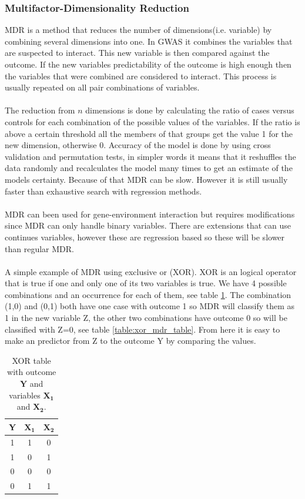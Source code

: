 \documentclass[10pt,a4paper]{report}
\begin{document}
\subsubsection{Multifactor-Dimensionality Reduction}
MDR is a method that reduces the number of dimensions(i.e. variable) by combining several dimensions into one. In GWAS it combines the variables that are suspected to interact. This new variable is then compared against the outcome. If the new variables predictability of the outcome is high enough then the variables that were combined are considered to interact. This process is usually repeated on all pair combinations of variables.\\
\\
The reduction from $n$ dimensions is done by calculating the ratio of cases versus controls for each combination of the possible values of the variables. If the ratio is above a certain threshold all the members of that groups get the value 1 for the new dimension, otherwise 0. Accuracy of the model is done by using cross validation and permutation tests, in simpler words it means that it reshuffles the data randomly and recalculates the model many times to get an estimate of the models certainty. Because of that MDR can be slow. However it is still usually faster than exhaustive search with regression methods.\cite{cordell_detect_review,mdr_2001}\\
\\
MDR can been used for gene-environment interaction but requires modifications since MDR can only handle binary variables. There are extensions that can use continues variables, however these are regression based so these will be slower than regular MDR.\cite{gene_enviroment_2013}\\
\\
A simple example of MDR using exclusive or (XOR). XOR is an logical operator that is true if one and only one of its two variables is true. We have 4 possible combinations and an occurrence for each of them, see table \ref{table:xor_table}. The combination (1,0) and (0,1) both have one case with outcome 1 so MDR will classify them as 1 in the new variable Z, the other two combinations have outcome 0 so will be classified with Z=0, see table \ref{table:xor_mdr_table}. From here it is easy to make an predictor from Z to the outcome Y by comparing the values.

\begin{table}[h]
\begin{tabular}{ | c | c | c | }
  \hline
  \textbf{Y} & $\mathbf{X_1}$ & $\mathbf{X_2}$ \\
  \hline
  1 & 1 & 0 \\
  \hline 
  1 & 0 & 1 \\
  \hline
  0 & 0 & 0 \\
  \hline
  0 & 1 & 1 \\
  \hline
\end{tabular}
\caption{XOR table with outcome $\mathbf{Y}$ and variables $\mathbf{X_1}$ and $\mathbf{X_2}$.}
\label{table:xor_table}
\end{table}
\end{document}
